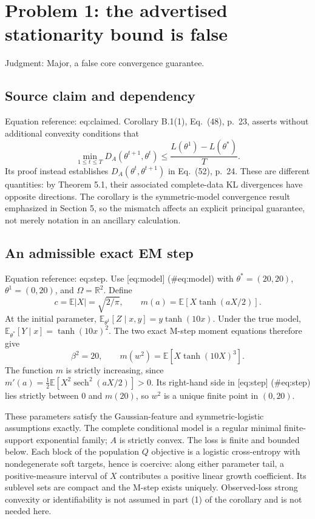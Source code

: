 \documentclass[10pt]{article}
\begin{document}
\section*{Problem 1: the advertised stationarity bound is false}
Judgment: Major, a false core convergence guarantee.\par
\subsection*{Source claim and dependency}
Equation reference: eq:claimed. Corollary B.1(1), Eq. (48), p. 23, asserts without additional convexity conditions that \[\min_{1\le t\le T}D_A(\theta^{t+1},\theta^t)
 \le \frac{L(\theta^1)-L(\theta^*)}{T}.
 \] Its proof instead establishes \(D_A(\theta^t,\theta^{t+1})\) in Eq. (52), p. 24. These are different quantities: by Theorem 5.1, their associated complete-data KL divergences have opposite directions. The corollary is the symmetric-model convergence result emphasized in Section 5, so the mismatch affects an explicit principal guarantee, not merely notation in an ancillary calculation.\par
\subsection*{An admissible exact EM step}
Equation reference: eq:step. Use [eq:model] (\#eq:model) with \(\theta^*=(20,20)\), \(\theta^1=(0,20)\), and \(\Omega=\mathbb R^2\). Define \[c=\mathbb E|X|=\sqrt{2/\pi},\qquad
 m(a)=\mathbb E[X\tanh(aX/2)] .\] At the initial parameter, \(\mathbb E_{\theta^1}[Z\mid x,y]=y\tanh(10x)\). Under the true model, \(\mathbb E_{\theta^*}[Y\mid x]=\tanh(10x)^2\). The two exact M-step moment equations therefore give \[\beta^2=20,\qquad
 m(w^2)=\mathbb E[X\tanh(10X)^3].
 \] The function \(m\) is strictly increasing, since \(m'(a)=\tfrac12\mathbb E[X^2\operatorname{sech}^2(aX/2)]>0\). Its right-hand side in [eq:step] (\#eq:step) lies strictly between \(0\) and \(m(20)\), so \(w^2\) is a unique finite point in \((0,20)\).\par
These parameters satisfy the Gaussian-feature and symmetric-logistic assumptions exactly. The complete conditional model is a regular minimal finite-support exponential family; \(A\) is strictly convex. The loss is finite and bounded below. Each block of the population \(Q\) objective is a logistic cross-entropy with nondegenerate soft targets, hence is coercive: along either parameter tail, a positive-measure interval of \(X\) contributes a positive linear growth coefficient. Its sublevel sets are compact and the M-step exists uniquely. Observed-loss strong convexity or identifiability is not assumed in part (1) of the corollary and is not needed here.\par
\end{document}
